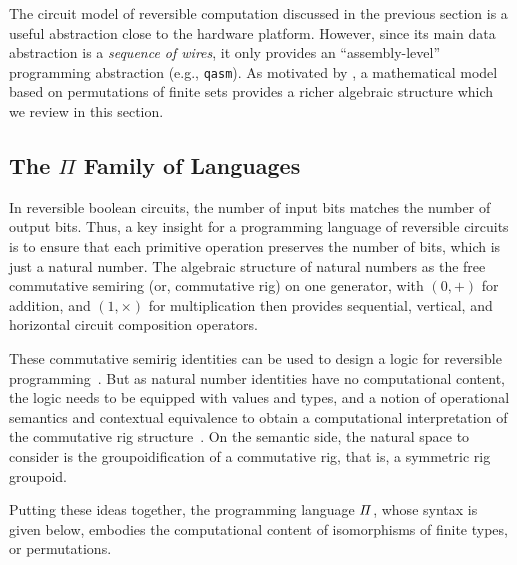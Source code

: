 The circuit model of reversible computation discussed in the previous section is a useful abstraction close to the hardware
platform. However, since its main data abstraction is a \emph{sequence of wires}, it only provides an ``assembly-level''
programming abstraction (e.g., \verb|qasm|). As motivated by \citet{LAFONT2003257}, a mathematical model based on
permutations of finite sets provides a richer algebraic structure which we review in this section.

\subsection{The $\Pi$ Family of Languages}
\label{sec:langRev-examples}
\label{examples}

In reversible boolean circuits, the number of input bits matches the number of output bits. Thus, a key insight for a
programming language of reversible circuits is to ensure that each primitive operation preserves the number of bits,
which is just a natural number. The algebraic structure of natural numbers as the free commutative semiring (or,
commutative rig) on one generator, with $(0,+)$ for addition, and $(1,\times)$ for multiplication then provides
sequential, vertical, and horizontal circuit composition operators.

These commutative semirig identities can be used to design a logic for reversible
programming~\cite*{sparksSuperstructuralReversibleLogic2014}. But as natural number identities have no computational
content, the logic needs to be equipped with values and types, and a notion of operational semantics and contextual
equivalence to obtain a computational interpretation of the commutative rig
structure~\cite{jamesInformationEffects2012}.  On the semantic side, the natural space to consider is the
groupoidification of a commutative rig, that is, a symmetric rig groupoid.

Putting these ideas together, the programming language $\mathit{\Pi}$, whose syntax is given below, embodies the
computational content of isomorphisms of finite types, or permutations.


